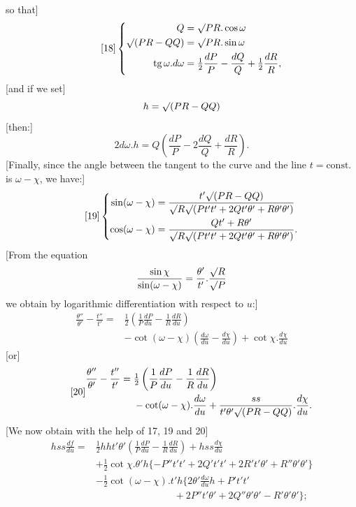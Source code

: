 %
\noindent so that]
\begin{equation}\tag*{[18]}
\left\{\begin{aligned}
Q&=\mathord{\surd}PR.\cos\omega\\
\mathord{\surd}(PR-QQ)&=\mathord{\surd}PR.\sin\omega\\
\operatorname{tg}\omega.d\omega&=\tfrac12\frac{dP}{P}-\frac{dQ}{Q}+\tfrac12\frac{dR}{R},
\end{aligned}\right.
\end{equation}
[and if we set]
\[
h=\mathord{\surd}(PR-QQ)
\]
[then:]
\begin{equation}\tag*{[$18'$]}
2d\omega.h=Q\left(\frac{dP}{P}-2\frac{dQ}{Q}+\frac{dR}{R}\right).
\end{equation}
[Finally, since the angle between the tangent to the curve and the line $t=\text{const.}$ is $\omega-\chi$, we have:]
\begin{equation}\tag*{[19]}
\left\{\begin{aligned}
\sin(\omega-\chi)&=\frac{t'\mathord{\surd}(PR-QQ)}{\mathord{\surd}R\mathord{\surd}(Pt't'+2Qt'\theta'+R\theta'\theta')}\\
\cos(\omega-\chi)&=\frac{Qt'+R\theta'}{\mathord{\surd}R\mathord{\surd}(Pt't'+2Qt'\theta'+R\theta'\theta')}.
\end{aligned}\right.
\end{equation}
[From the equation
\[
\frac{\sin\chi}{\sin(\omega-\chi)}=\frac{\theta'}{t'}.\frac{\mathord{\surd}R}{\mathord{\surd}P}
\]
we obtain by logarithmic differentiation with respect to $u$:]
\[
\begin{aligned}
\frac{\theta''}{\theta'}-\frac{t''}{t'}={}&\tfrac12\left(\frac1P\frac{dP}{du}-\frac1R\frac{dR}{du}\right)\\
&-\cot(\omega-\chi)\left(\frac{d\omega}{du}-\frac{d\chi}{du}\right)+\cot\chi.\frac{d\chi}{du}
\end{aligned}
\]
[or]
\begin{equation}\tag*{[20]}
\begin{aligned}
\frac{\theta''}{\theta'}-\frac{t''}{t'}={}&\tfrac12\left(\frac1P\frac{dP}{du}-\frac1R\frac{dR}{du}\right)\\
&-\cot(\omega-\chi).\frac{d\omega}{du}+\frac{ss}{t'\theta'\mathord{\surd}(PR-QQ)}.\frac{d\chi}{du}.
\end{aligned}
\end{equation}
[We now obtain with the help of 17, 19 and 20]
\[
\begin{aligned}
hss\frac{df}{du}={}&\tfrac12hht'\theta'\left(\frac1P\frac{dP}{du}-\frac1R\frac{dR}{du}\right)+hss\frac{d\chi}{du}\\
&+\tfrac12\cot\chi.\theta'h\{-P''t't'+2Q't't'+2R't'\theta'+R''\theta'\theta'\}\\
&-\tfrac12\cot(\omega-\chi).t'h\{2\theta'\frac{d\omega}{du}h+P't't'\\
&\hspace{8em}+2P''t'\theta'+2Q''\theta'\theta'-R'\theta'\theta'\};
\end{aligned}
\]
